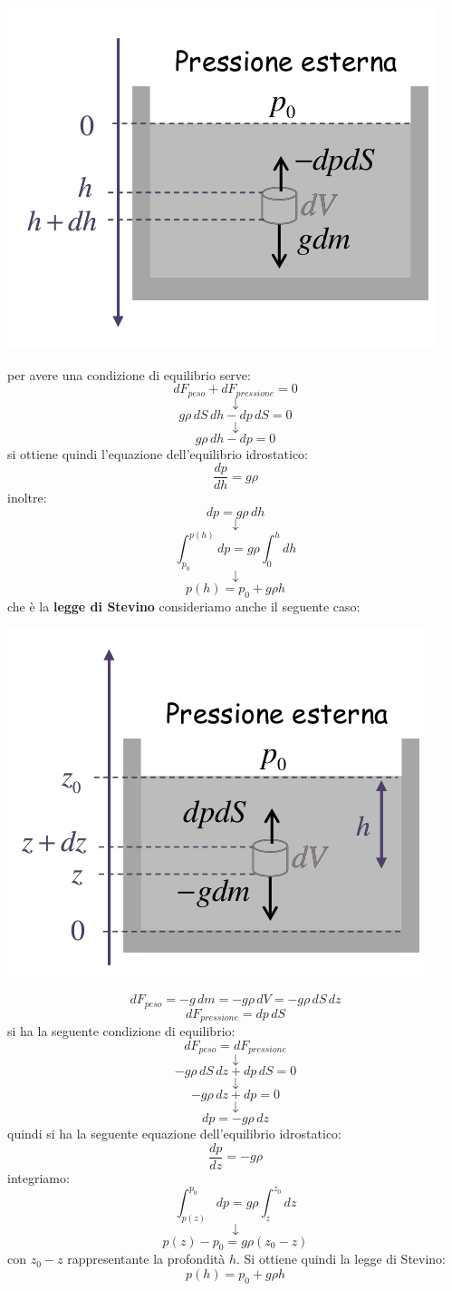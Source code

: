 \documentclass[a4paper,12pt, oneside]{book}
\begin{document}
\begin{center}
	\includegraphics[scale=0.5]{img/flu3.png}
\end{center}
per avere una condizione di equilibrio serve:
$$dF_{peso}+dF_{pressione}=0$$
$$\downarrow$$
$$g\rho \,dS\,dh-dp\,dS=0$$
$$\downarrow$$
$$g\rho \,dh-dp=0$$
si ottiene quindi l'equazione dell'equilibrio idrostatico:
$$\frac{dp}{dh}=g\rho$$
inoltre:
$$dp=g\rho\,dh$$
$$\downarrow$$
$$\int_{p_0}^{p(h)}dp=g\rho\int_0^hdh$$
$$\downarrow$$
$$p(h)=p_0+g\rho h$$
che è la \textbf{legge di Stevino}
\newpage
consideriamo anche il seguente caso:
\begin{center}
	\includegraphics[scale=0.5]{img/flu4.png}
\end{center}
$$dF_{peso}=-g\,dm=-g\rho\, dV=-g\rho\, dS\,dz$$
$$dF_{pressione}=dp\,dS$$
si ha la seguente condizione di equilibrio:
$$dF_{peso}=dF_{pressione}$$
$$\downarrow$$
$$-g\rho\, dS\,dz+dp\,dS=0$$
$$\downarrow$$
$$-g\rho\,dz+dp=0$$
$$\downarrow$$
$$dp=-g\rho\,dz$$
quindi si ha la seguente equazione dell'equilibrio idrostatico:
$$\frac{dp}{dz}=-g\rho$$
integriamo:
$$\int_{p(z)}^{p_0}dp=g\rho\int_z^{z_0}dz$$
$$\downarrow$$
$$p(z)-p_0=g\rho(z_0-z)$$
con $z_0-z$ rappresentante la profondità $h$. Si ottiene quindi la legge di Stevino:
$$p(h)=p_0+g\rho h$$
\end{document}
